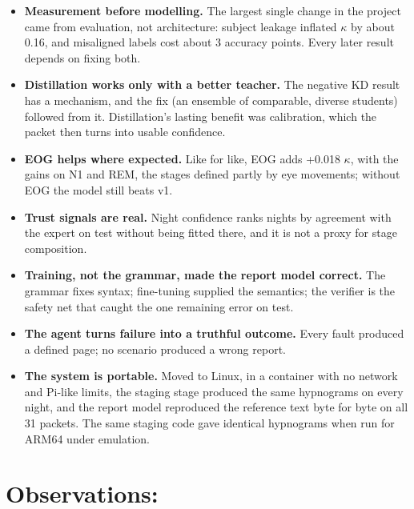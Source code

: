 \begin{itemize}
  \item \textbf{Measurement before modelling.} The largest single change in the project came from evaluation, not
  architecture: subject leakage inflated $\kappa$ by about 0.16, and misaligned labels cost about 3 accuracy points.
  Every later result depends on fixing both.
  \item \textbf{Distillation works only with a better teacher.} The negative KD result has a mechanism, and the fix
  (an ensemble of comparable, diverse students) followed from it. Distillation's lasting benefit was calibration,
  which the packet then turns into usable confidence.
  \item \textbf{EOG helps where expected.} Like for like, EOG adds +0.018 $\kappa$, with the gains on N1 and REM,
  the stages defined partly by eye movements; without EOG the model still beats v1.
  \item \textbf{Trust signals are real.} Night confidence ranks nights by agreement with the expert on test without
  being fitted there, and it is not a proxy for stage composition.
  \item \textbf{Training, not the grammar, made the report model correct.} The grammar fixes syntax; fine-tuning
  supplied the semantics; the verifier is the safety net that caught the one remaining error on test.
  \item \textbf{The agent turns failure into a truthful outcome.} Every fault produced a defined page; no scenario
  produced a wrong report.
  \item \textbf{The system is portable.} Moved to Linux, in a container with no network and Pi-like limits, the
  staging stage produced the same hypnograms on every night, and the report model reproduced the reference text
  byte for byte on all 31 packets. The same staging code gave identical hypnograms when run for ARM64 under emulation.
\end{itemize}

\section{Observations:}

